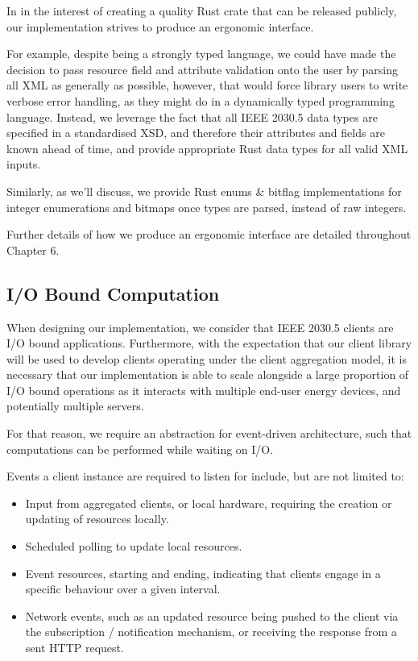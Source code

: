 In in the interest of creating a quality Rust crate that can be released publicly, our implementation strives to produce an ergonomic interface. 

For example, despite being a strongly typed language, we could have made the decision to pass resource field and attribute validation onto the user by parsing all XML as generally as possible, however, that would force library users to write verbose error handling, as they might do in a dynamically typed programming language. Instead, we leverage the fact that all IEEE 2030.5 data types are specified in a standardised XSD, and therefore their attributes and fields are known ahead of time, and provide appropriate Rust data types for all valid XML inputs.

Similarly, as we'll discuss, we provide Rust enums \& bitflag implementations for integer enumerations and bitmaps once types are parsed, instead of raw integers.

Further details of how we produce an ergonomic interface are detailed throughout Chapter 6.

\subsection{I/O Bound Computation}
When designing our implementation, we consider that IEEE 2030.5 clients are I/O bound applications. Furthermore, with the expectation that our client library will be used to develop clients operating under the client aggregation model, it is necessary that our implementation is able to scale alongside a large proportion of I/O bound operations as it interacts with multiple end-user energy devices, and potentially multiple servers.

For that reason, we require an abstraction for event-driven architecture, such that computations can be performed while waiting on I/O.

Events a client instance are required to listen for include, but are not limited to:

\begin{itemize}
    \item Input from aggregated clients, or local hardware, requiring the creation or updating of resources locally.
    \item Scheduled polling to update local resources.
    \item Event resources, starting and ending, indicating that clients engage in a specific behaviour over a given interval.
    \item Network events, such as an updated resource being pushed to the client via the subscription / notification mechanism, or receiving the response from a sent HTTP request.
\end{itemize}

